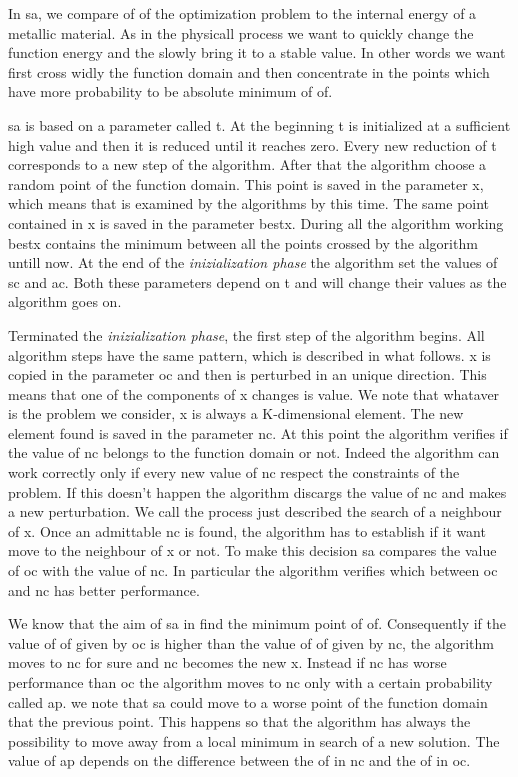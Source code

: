 \documentclass[journal]{IEEEtran}
\begin{document}
In \gls{sa}, we compare \gls{of} of the optimization problem to the internal energy of a metallic material. As in the physicall process we want to quickly change the function energy and the slowly bring it to a stable value. In other words we want first cross widly the function domain and then concentrate in the points which have more probability to be absolute minimum of \gls{of}.

\gls{sa} is based on a parameter called \gls{t}. At the beginning \gls{t} is initialized at a sufficient high value and then it is reduced until it reaches zero. Every new reduction of \gls{t} corresponds to a new step of the algorithm. After that the algorithm choose a random point of the function domain. This point is saved in the parameter \gls{x}, which means that is examined by the algorithms by this time. The same point contained in \gls{x} is saved in the parameter \gls{bestx}. During all the algorithm working \gls{bestx} contains the minimum between all the points crossed by the algorithm untill now. At the end of the \textit{inizialization phase} the algorithm set the values of \gls{sc} and \gls{ac}. Both these parameters depend on \gls{t} and will change their values as the algorithm goes on.

Terminated the \textit{inizialization phase}, the first step of the algorithm begins. All algorithm steps have the  same pattern, which is described in what follows. \gls{x} is copied in the parameter \gls{oc} and then is perturbed in an unique direction. This means that one of the components of \gls{x} changes is value. We note that whataver is the problem we consider, \gls{x} is always a K-dimensional element. The new element found is saved in the parameter \gls{nc}. At this point the algorithm verifies if the value of \gls{nc} belongs to the function domain or not. Indeed the algorithm can work correctly only if every new value of \gls{nc} respect the constraints of the problem. If this doesn't happen the algorithm discargs the value of \gls{nc} and makes a new perturbation. We call the process just described the search of a neighbour of \gls{x}. Once an admittable \gls{nc} is found, the algorithm has to establish if it want move to the neighbour of \gls{x} or not. To make this decision \gls{sa} compares the value of \gls{oc} with the value of \gls{nc}. In particular the algorithm verifies which between \gls{oc} and \gls{nc} has better performance.

We know that the aim of \gls{sa} in find the minimum point of \gls{of}. Consequently if the value of \gls{of} given by \gls{oc} is higher than the value of \gls{of} given by \gls{nc}, the algorithm moves to \gls{nc} for sure and \gls{nc} becomes the new \gls{x}. Instead if \gls{nc} has worse performance than \gls{oc} the algorithm moves to \gls{nc} only with a certain probability called \gls{ap}. we note that \gls{sa} could move to a worse point of the function domain that the previous point. This happens so that the algorithm has always the possibility to move away from a local minimum in search of a new solution. The value of \gls{ap} depends on the difference between the \gls{of} in \gls{nc} and the \gls{of} in \gls{oc}.
\end{document}
